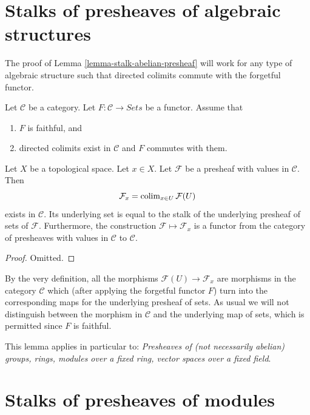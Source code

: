 \section{Stalks of presheaves of algebraic structures}
\label{section-stalks-presheaves-structures}

\noindent
The proof of Lemma \ref{lemma-stalk-abelian-presheaf} will work
for any type of algebraic structure such that directed
colimits commute with the forgetful functor.

\begin{lemma}
\label{lemma-stalk-presheaf-values-in-category}
Let $\mathcal{C}$ be a category. Let $F : \mathcal{C} \to \textit{Sets}$
be a functor. Assume that
\begin{enumerate}
\item $F$ is faithful, and
\item directed colimits exist in $\mathcal{C}$ and $F$ commutes with
them.
\end{enumerate}
Let $X$ be a topological space. Let $x \in X$. Let $\mathcal{F}$
be a presheaf with values in $\mathcal{C}$.
Then
$$
\mathcal{F}_x = \mathop{\mathrm{colim}}\nolimits_{x\in U} \mathcal{F}(U)
$$
exists in $\mathcal{C}$. Its underlying set is equal to the
stalk of the underlying presheaf of sets of $\mathcal{F}$.
Furthermore, the construction $\mathcal{F} \mapsto \mathcal{F}_x$
is a functor from the category of presheaves with values in
$\mathcal{C}$ to $\mathcal{C}$.
\end{lemma}

\begin{proof}
Omitted.
\end{proof}

\noindent
By the very definition, all the morphisms $\mathcal{F}(U)
\to \mathcal{F}_x$ are morphisms in the category $\mathcal{C}$
which (after applying the forgetful functor $F$) turn into
the corresponding maps for the underlying presheaf of sets.
As usual we will not distinguish between the morphism
in $\mathcal{C}$ and the underlying map of sets, which
is permitted since $F$ is faithful.

\medskip\noindent
This lemma applies in particular to:
{\it Presheaves of (not necessarily abelian) groups, rings, modules
over a fixed ring, vector spaces over a fixed field}.

\section{Stalks of presheaves of modules}
\label{section-stalk-presheaves-modules}

